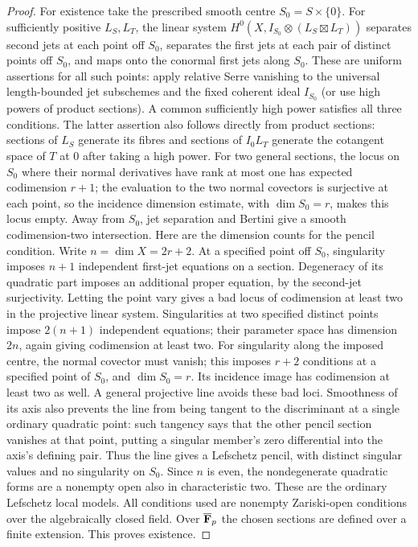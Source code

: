 \documentclass[11pt]{article}
\theoremstyle{remark}\newtheorem{remark}[theorem]{Remark}
\begin{document}
\begin{proof}
For existence take the prescribed smooth centre $S_0=S\times\{0\}$.
For sufficiently positive $L_S,L_T$, the linear system
$H^0(X,I_{S_0}\otimes(L_S\boxtimes L_T))$ separates second jets
at each point off $S_0$, separates the first jets at each pair of
distinct points off $S_0$, and maps onto the conormal first jets
along $S_0$. These are uniform assertions for all such points:
apply relative Serre vanishing to the universal length-bounded
jet subschemes and the fixed coherent ideal $I_{S_0}$ (or use
high powers of product sections). A common sufficiently high
power satisfies all three conditions.
The latter assertion also follows directly from product sections:
sections of $L_S$ generate its fibres and sections of $I_0L_T$
generate the cotangent space of $T$ at $0$ after taking a high power.
For two general sections, the locus on $S_0$ where their normal
derivatives have rank at most one has expected codimension $r+1$;
the evaluation to the two normal covectors is surjective at each
point, so the incidence dimension estimate, with $\dim S_0=r$,
makes this locus empty. Away from $S_0$, jet separation and
Bertini give a smooth codimension-two intersection. Here are the
dimension counts for the pencil condition. Write $n=\dim X=2r+2$.
At a specified point off $S_0$, singularity imposes $n+1$
independent first-jet equations on a section. Degeneracy of its
quadratic part imposes an additional proper equation, by the
second-jet surjectivity. Letting the point vary gives a bad locus
of codimension at least two in the projective linear system.
Singularities at two specified distinct points impose $2(n+1)$
independent equations; their parameter space has dimension $2n$,
again giving codimension at least two. For singularity along the
imposed centre, the normal covector must vanish; this imposes
$r+2$ conditions at a specified point of $S_0$, and $\dim S_0=r$.
Its incidence image has codimension at least two as well. A general
projective line avoids these bad loci. Smoothness of its axis
also prevents the line from being tangent to the discriminant at
a single ordinary quadratic point: such tangency says that the
other pencil section vanishes at that point, putting a singular
member's zero differential into the axis's defining pair.
Thus the line gives a Lefschetz pencil, with distinct singular
values and no singularity on $S_0$. Since $n$ is even, the
nondegenerate quadratic forms are a nonempty open also in
characteristic two. These are the ordinary Lefschetz local models.
All conditions used are nonempty Zariski-open conditions over the
algebraically closed field. Over $\overline{\mathbf F}_p$ the chosen
sections are defined over a finite extension. This proves existence.
\end{proof}
\end{document}
